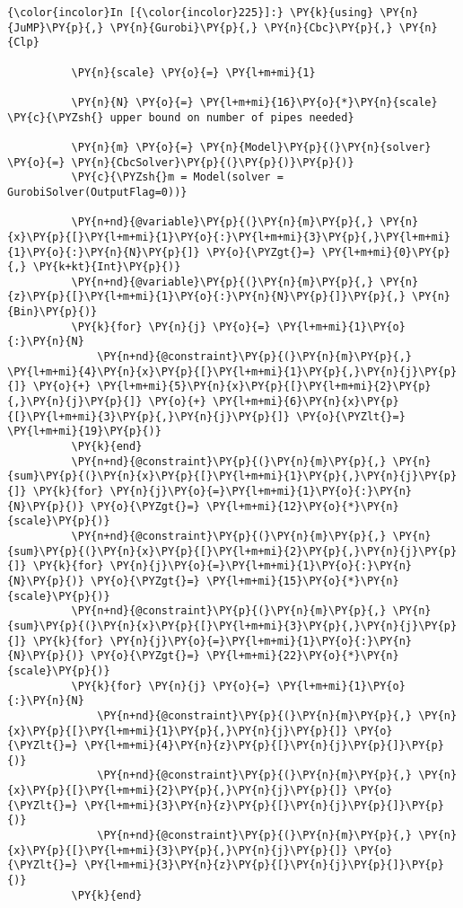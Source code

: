     \begin{Verbatim}[commandchars=\\\{\}]
{\color{incolor}In [{\color{incolor}225}]:} \PY{k}{using} \PY{n}{JuMP}\PY{p}{,} \PY{n}{Gurobi}\PY{p}{,} \PY{n}{Cbc}\PY{p}{,} \PY{n}{Clp}
          
          \PY{n}{scale} \PY{o}{=} \PY{l+m+mi}{1}
          
          \PY{n}{N} \PY{o}{=} \PY{l+m+mi}{16}\PY{o}{*}\PY{n}{scale}  \PY{c}{\PYZsh{} upper bound on number of pipes needed}
          
          \PY{n}{m} \PY{o}{=} \PY{n}{Model}\PY{p}{(}\PY{n}{solver} \PY{o}{=} \PY{n}{CbcSolver}\PY{p}{(}\PY{p}{)}\PY{p}{)}
          \PY{c}{\PYZsh{}m = Model(solver = GurobiSolver(OutputFlag=0))}
          
          \PY{n+nd}{@variable}\PY{p}{(}\PY{n}{m}\PY{p}{,} \PY{n}{x}\PY{p}{[}\PY{l+m+mi}{1}\PY{o}{:}\PY{l+m+mi}{3}\PY{p}{,}\PY{l+m+mi}{1}\PY{o}{:}\PY{n}{N}\PY{p}{]} \PY{o}{\PYZgt{}=} \PY{l+m+mi}{0}\PY{p}{,} \PY{k+kt}{Int}\PY{p}{)}
          \PY{n+nd}{@variable}\PY{p}{(}\PY{n}{m}\PY{p}{,} \PY{n}{z}\PY{p}{[}\PY{l+m+mi}{1}\PY{o}{:}\PY{n}{N}\PY{p}{]}\PY{p}{,} \PY{n}{Bin}\PY{p}{)}
          \PY{k}{for} \PY{n}{j} \PY{o}{=} \PY{l+m+mi}{1}\PY{o}{:}\PY{n}{N}
              \PY{n+nd}{@constraint}\PY{p}{(}\PY{n}{m}\PY{p}{,} \PY{l+m+mi}{4}\PY{n}{x}\PY{p}{[}\PY{l+m+mi}{1}\PY{p}{,}\PY{n}{j}\PY{p}{]} \PY{o}{+} \PY{l+m+mi}{5}\PY{n}{x}\PY{p}{[}\PY{l+m+mi}{2}\PY{p}{,}\PY{n}{j}\PY{p}{]} \PY{o}{+} \PY{l+m+mi}{6}\PY{n}{x}\PY{p}{[}\PY{l+m+mi}{3}\PY{p}{,}\PY{n}{j}\PY{p}{]} \PY{o}{\PYZlt{}=} \PY{l+m+mi}{19}\PY{p}{)}
          \PY{k}{end}
          \PY{n+nd}{@constraint}\PY{p}{(}\PY{n}{m}\PY{p}{,} \PY{n}{sum}\PY{p}{(}\PY{n}{x}\PY{p}{[}\PY{l+m+mi}{1}\PY{p}{,}\PY{n}{j}\PY{p}{]} \PY{k}{for} \PY{n}{j}\PY{o}{=}\PY{l+m+mi}{1}\PY{o}{:}\PY{n}{N}\PY{p}{)} \PY{o}{\PYZgt{}=} \PY{l+m+mi}{12}\PY{o}{*}\PY{n}{scale}\PY{p}{)}
          \PY{n+nd}{@constraint}\PY{p}{(}\PY{n}{m}\PY{p}{,} \PY{n}{sum}\PY{p}{(}\PY{n}{x}\PY{p}{[}\PY{l+m+mi}{2}\PY{p}{,}\PY{n}{j}\PY{p}{]} \PY{k}{for} \PY{n}{j}\PY{o}{=}\PY{l+m+mi}{1}\PY{o}{:}\PY{n}{N}\PY{p}{)} \PY{o}{\PYZgt{}=} \PY{l+m+mi}{15}\PY{o}{*}\PY{n}{scale}\PY{p}{)}
          \PY{n+nd}{@constraint}\PY{p}{(}\PY{n}{m}\PY{p}{,} \PY{n}{sum}\PY{p}{(}\PY{n}{x}\PY{p}{[}\PY{l+m+mi}{3}\PY{p}{,}\PY{n}{j}\PY{p}{]} \PY{k}{for} \PY{n}{j}\PY{o}{=}\PY{l+m+mi}{1}\PY{o}{:}\PY{n}{N}\PY{p}{)} \PY{o}{\PYZgt{}=} \PY{l+m+mi}{22}\PY{o}{*}\PY{n}{scale}\PY{p}{)}
          \PY{k}{for} \PY{n}{j} \PY{o}{=} \PY{l+m+mi}{1}\PY{o}{:}\PY{n}{N}
              \PY{n+nd}{@constraint}\PY{p}{(}\PY{n}{m}\PY{p}{,} \PY{n}{x}\PY{p}{[}\PY{l+m+mi}{1}\PY{p}{,}\PY{n}{j}\PY{p}{]} \PY{o}{\PYZlt{}=} \PY{l+m+mi}{4}\PY{n}{z}\PY{p}{[}\PY{n}{j}\PY{p}{]}\PY{p}{)}
              \PY{n+nd}{@constraint}\PY{p}{(}\PY{n}{m}\PY{p}{,} \PY{n}{x}\PY{p}{[}\PY{l+m+mi}{2}\PY{p}{,}\PY{n}{j}\PY{p}{]} \PY{o}{\PYZlt{}=} \PY{l+m+mi}{3}\PY{n}{z}\PY{p}{[}\PY{n}{j}\PY{p}{]}\PY{p}{)}
              \PY{n+nd}{@constraint}\PY{p}{(}\PY{n}{m}\PY{p}{,} \PY{n}{x}\PY{p}{[}\PY{l+m+mi}{3}\PY{p}{,}\PY{n}{j}\PY{p}{]} \PY{o}{\PYZlt{}=} \PY{l+m+mi}{3}\PY{n}{z}\PY{p}{[}\PY{n}{j}\PY{p}{]}\PY{p}{)}
          \PY{k}{end}
          

\end{Verbatim}
